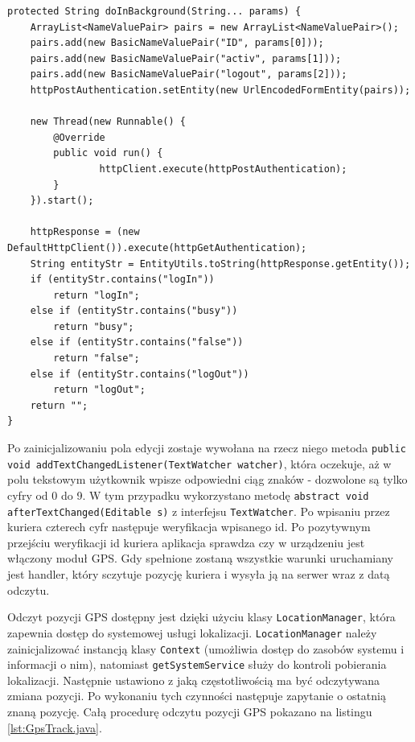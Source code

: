\documentclass[eng,printmode,oneside]{mgr}
\begin{document}
\begin{lstlisting}[caption=klasa
AuthenticationDeliverer metoda
doInBackground,label=lst:AuthentictionDeliverer.java]
protected String doInBackground(String... params) {
	ArrayList<NameValuePair> pairs = new ArrayList<NameValuePair>();
	pairs.add(new BasicNameValuePair("ID", params[0]));
	pairs.add(new BasicNameValuePair("activ", params[1]));
	pairs.add(new BasicNameValuePair("logout", params[2]));
	httpPostAuthentication.setEntity(new UrlEncodedFormEntity(pairs));
	
	new Thread(new Runnable() {
		@Override
		public void run() {
				httpClient.execute(httpPostAuthentication);
		}
	}).start();
	
	httpResponse = (new DefaultHttpClient()).execute(httpGetAuthentication);
	String entityStr = EntityUtils.toString(httpResponse.getEntity());
	if (entityStr.contains("logIn"))
		return "logIn";
	else if (entityStr.contains("busy"))
		return "busy";
	else if (entityStr.contains("false"))
		return "false";
	else if (entityStr.contains("logOut"))
		return "logOut";
	return "";
}
\end{lstlisting}

Po zainicjalizowaniu pola edycji zostaje wywołana na rzecz niego metoda
\texttt{public void addTextChangedListener(TextWatcher watcher)}, która
oczekuje, aż w polu tekstowym użytkownik wpisze odpowiedni ciąg znaków -
dozwolone są tylko cyfry od 0 do 9. W tym przypadku wykorzystano metodę
\texttt{abstract void afterTextChanged(Editable s)} z interfejsu
\texttt{TextWatcher}. Po wpisaniu przez kuriera czterech cyfr następuje weryfikacja wpisanego id. Po pozytywnym
przejściu weryfikacji id kuriera aplikacja sprawdza czy w urządzeniu jest
włączony moduł GPS. Gdy spełnione zostaną wszystkie warunki uruchamiany jest
handler, który sczytuje pozycję kuriera i wysyła ją na serwer wraz z datą odczytu. 

Odczyt pozycji GPS dostępny jest dzięki użyciu klasy \texttt{LocationManager},
która zapewnia dostęp do systemowej usługi lokalizacji. \texttt{LocationManager}
należy zainicjalizować instancją klasy \texttt{Context} (umożliwia dostęp do
zasobów systemu i informacji o nim), natomiast \texttt{getSystemService} służy
do kontroli pobierania lokalizacji. Następnie ustawiono z jaką częstotliwością
ma być odczytywana zmiana pozycji. Po wykonaniu tych czynności następuje
zapytanie o ostatnią znaną pozycję. Całą procedurę odczytu pozycji GPS pokazano
na listingu \ref{lst:GpsTrack.java}.
\end{document}
